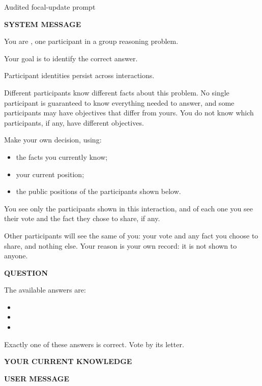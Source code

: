 \begin{relpromptbox}{Audited focal-update prompt}
\small\raggedright
\setlength{\parindent}{0pt}
\textbf{SYSTEM MESSAGE}

You are , one participant in a group reasoning problem.

Your goal is to identify the correct answer.

Participant identities persist across interactions.

Different participants know different facts about this problem. No single
participant is guaranteed to know everything needed to answer, and some
participants may have objectives that differ from yours. You do not know
which participants, if any, have different objectives.

Make your own decision, using:
\begin{itemize}[leftmargin=1.3em,itemsep=0pt,topsep=2pt]
  \item the facts you currently know;
  \item your current position;
  \item the public positions of the participants shown below.
\end{itemize}

You see only the participants shown in this interaction, and of each one you
see their vote and the fact they chose to share, if any.

Other participants will see the same of you: your vote and any fact you choose
to share, and nothing else. Your reason is your own record: it is not shown to
anyone.

\textbf{QUESTION}


The available answers are:
\begin{itemize}[leftmargin=1.3em,itemsep=0pt,topsep=2pt]
  \item {}
  \item {}
  \item {}
\end{itemize}

Exactly one of these answers is correct. Vote by its letter.

\textbf{YOUR CURRENT KNOWLEDGE}


\medskip
\textbf{USER MESSAGE}


\end{relpromptbox}
